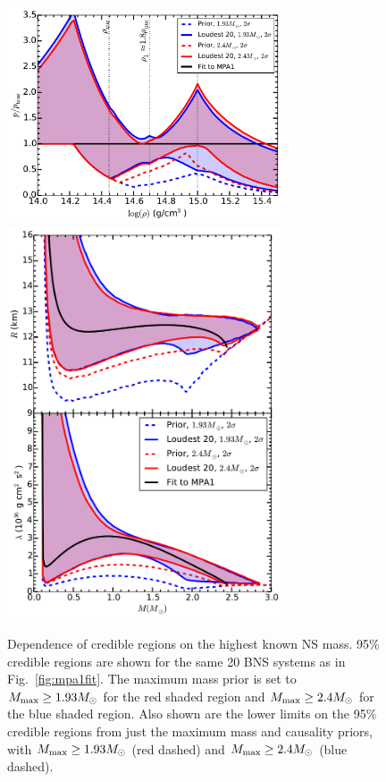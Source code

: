 \documentclass[twocolumn,prd,amssymb,aps,nofootinbib,showpacs,epsf]{revtex4}
\begin{document}
\begin{figure}[!htb]
\begin{center}
\includegraphics[width=3.2in]{priormmaxperror.pdf}\\
\includegraphics[width=3.2in]{priormmaxRadiuslambda.pdf}
\caption{Dependence of credible regions on the highest known NS mass. 95\% credible regions are shown for the same 20 BNS systems as in Fig.~\ref{fig:mpa1fit}. The maximum mass prior is set to $M_{\rm max} \geq 1.93M_\odot$ for the red shaded region and $M_{\rm max} \geq 2.4M_\odot$ for the blue shaded region. Also shown are the lower limits on the 95\% credible regions from just the maximum mass and causality priors, with $M_{\rm max} \geq 1.93M_\odot$ (red dashed) and $M_{\rm max} \geq 2.4M_\odot$ (blue dashed).}
\label{fig:varymmax}
\end{center}
\end{figure}
\end{document}
